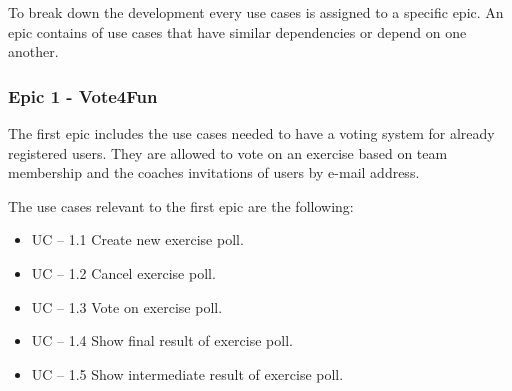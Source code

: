 To break down the development every use cases is assigned to a specific epic. An epic contains of use cases that have similar dependencies or depend on one another.

\subsubsection{Epic 1 - Vote4Fun}
\label{sssec:epic1}

The first epic includes the use cases needed to have a voting system for already registered users. They are allowed to vote on an exercise based on team membership and the coaches invitations of users by e-mail address.

The use cases relevant to the first epic are the following:

\begin{itemize}
    \item UC – 1.1 
    \newline
    Create new exercise poll.
    \item UC – 1.2 
    \newline
    Cancel exercise poll.
    \item UC – 1.3 
    \newline
    Vote on exercise poll.
    \item UC – 1.4 
    \newline
    Show final result of exercise poll.
    \item UC – 1.5 
    \newline
    Show intermediate result of exercise poll.
\end{itemize}

